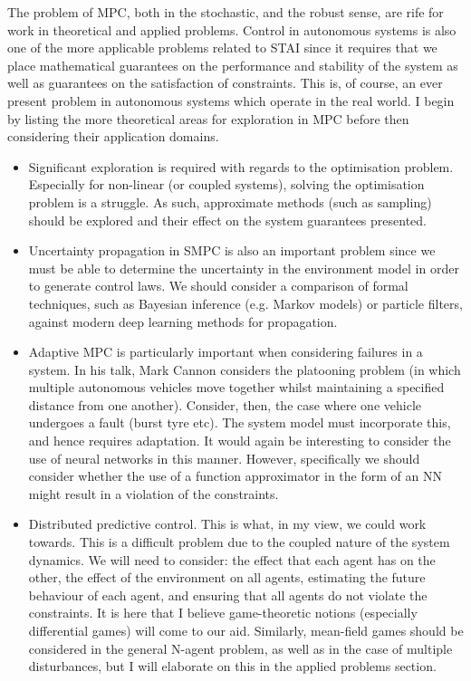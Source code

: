 \documentclass[preprint,11pt]{report}
\begin{document}
The problem of MPC, both in the stochastic, and the robust sense, are rife for work in theoretical
and applied problems. Control in autonomous systems is also one of the more applicable problems
related to STAI since it requires that we place mathematical guarantees on the performance and
stability of the system as well as guarantees on the satisfaction of constraints. This is, of
course, an ever present problem in autonomous systems which operate in the real world. I begin by
listing the more theoretical areas for exploration in MPC before then considering their application
domains.

\begin{itemize}
	\item Significant exploration is required with regards to the optimisation problem. Especially
	for non-linear (or coupled systems), solving the optimisation problem is a struggle. As such,
	approximate methods (such as sampling) should be explored and their effect on the system
	guarantees presented.
	\item Uncertainty propagation in SMPC is also an important problem since we must be able to
	determine the uncertainty in the environment model in order to generate control laws. We should
	consider a comparison of formal techniques, such as Bayesian inference (e.g. Markov models) or
	particle filters, against modern deep learning methods for propagation.
	\item Adaptive MPC is particularly important when considering failures in a system. In his talk,
	Mark Cannon considers the platooning problem (in which multiple autonomous vehicles move
	together whilst maintaining a specified distance from one another). Consider, then, the case
	where one vehicle undergoes a fault (burst tyre etc). The system model must incorporate this,
	and hence requires adaptation. It would again be interesting to consider the use of neural
	networks in this manner. However, specifically we should consider whether the use of a function
	approximator in the form of an NN might result in a violation of the constraints.
	\item Distributed predictive control. This is what, in my view, we could work towards. This is a
	difficult problem due to the coupled nature of the system dynamics. We will need to consider: the
	effect that each agent has on the other, the effect of the environment on all agents, estimating the
	future behaviour of each agent, and ensuring that all agents do not violate the constraints. It is
	here that I believe game-theoretic notions (especially differential games) will come to our
	aid. Similarly, mean-field games should be considered in the general N-agent problem, as well as
	in the case of multiple disturbances, but I will elaborate on this in the applied problems
	section.
\end{itemize}
\end{document}
